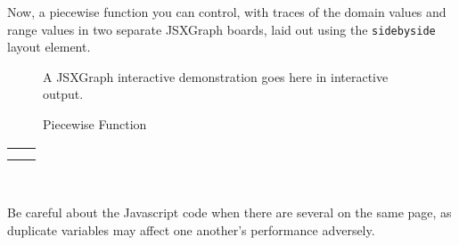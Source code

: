 \documentclass[10pt,]{article}
\theoremstyle{plain}
\theoremstyle{definition}
\theoremstyle{definition}
\theoremstyle{definition}
\theoremstyle{definition}
\theoremstyle{definition}
\theoremstyle{definition}
\numberwithin{equation}{section}
\newlength{\panelmax}
\begin{document}
\par
\hypertarget{p-490}{}%
Now, a piecewise function you can control, with traces of the domain values and range values in two separate JSXGraph boards, laid out using the \lstinline?sidebyside? layout element.%
\begin{figure}
\centering
\par\smallskip\centerline{A JSXGraph interactive demonstration goes here in interactive output.}\smallskip
\caption{Piecewise Function\label{figure-23}}
\end{figure}
{%
\setlength{\panelmax}{0pt}
\ifdefined\panelboxAjsxgraph\else\newsavebox{\panelboxAjsxgraph}\fi%
\savebox{\panelboxAjsxgraph}{%
\parbox{70pt}{[jsxgraph]}}
\ifdefined\phAjsxgraph\else\newlength{\phAjsxgraph}\fi%
\setlength{\phAjsxgraph}{\ht\panelboxAjsxgraph+\dp\panelboxAjsxgraph}
\settototalheight{\phAjsxgraph}{\usebox{\panelboxAjsxgraph}}
\setlength{\panelmax}{\maxof{\panelmax}{\phAjsxgraph}}
\ifdefined\panelboxBjsxgraph\else\newsavebox{\panelboxBjsxgraph}\fi%
\savebox{\panelboxBjsxgraph}{%
\parbox{70pt}{[jsxgraph]}}
\ifdefined\phBjsxgraph\else\newlength{\phBjsxgraph}\fi%
\setlength{\phBjsxgraph}{\ht\panelboxBjsxgraph+\dp\panelboxBjsxgraph}
\settototalheight{\phBjsxgraph}{\usebox{\panelboxBjsxgraph}}
\setlength{\panelmax}{\maxof{\panelmax}{\phBjsxgraph}}
\leavevmode%
\setlength{\tabcolsep}{0.05\linewidth}
\par\medskip\noindent
\hspace*{0.05\linewidth}%
\begin{tabular}{@{}*{2}{c}@{}}
\begin{minipage}[c][\panelmax][t]{0.4\linewidth}\usebox{\panelboxAjsxgraph}\end{minipage}&
\begin{minipage}[c][\panelmax][t]{0.4\linewidth}\usebox{\panelboxBjsxgraph}\end{minipage}\tabularnewline
\parbox[t]{0.4\linewidth}{
}&
\parbox[t]{0.4\linewidth}{
}\end{tabular}\\
}%
\par
\hypertarget{p-491}{}%
Be careful about the Javascript code when there are several on the same page, as duplicate variables may affect one another's performance adversely.%
\typeout{************************************************}
\typeout{************************************************}
\end{document}
